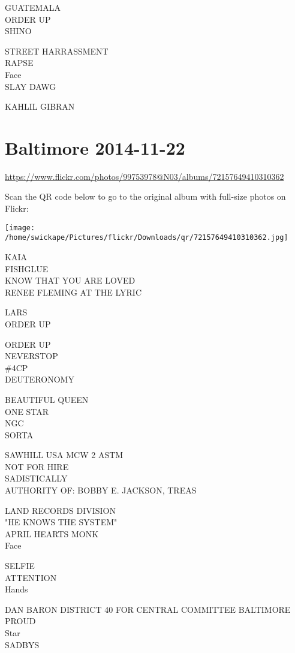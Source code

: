 \documentclass[10pt,letterpaper]{article}
\begin{document}
GUATEMALA\\
ORDER UP\\
SHINO

STREET HARRASSMENT\\
RAPSE\\
Face\\
SLAY DAWG

KAHLIL GIBRAN
\pagebreak

\section*{Baltimore 2014-11-22}

\url{https://www.flickr.com/photos/99753978@N03/albums/72157649410310362}

Scan the QR code below to go to the original album with full-size photos on Flickr:

\texttt{[image: /home/swickape/Pictures/flickr/Downloads/qr/72157649410310362.jpg]}
\pagebreak

KAIA\\
FISHGLUE\\
KNOW THAT YOU ARE LOVED\\
RENEE FLEMING AT THE LYRIC

LARS\\
ORDER UP

ORDER UP\\
NEVERSTOP\\
\#4CP\\
DEUTERONOMY

BEAUTIFUL QUEEN\\
ONE STAR\\
NGC\\
SORTA

SAWHILL USA MCW 2 ASTM\\
NOT FOR HIRE\\
SADISTICALLY\\
AUTHORITY OF: BOBBY E. JACKSON, TREAS

LAND RECORDS DIVISION\\
"HE KNOWS THE SYSTEM"\\
APRIL HEARTS MONK\\
Face

SELFIE\\
ATTENTION\\
Hands

DAN BARON DISTRICT 40 FOR CENTRAL COMMITTEE BALTIMORE PROUD\\
Star\\
SADBYS
\end{document}
